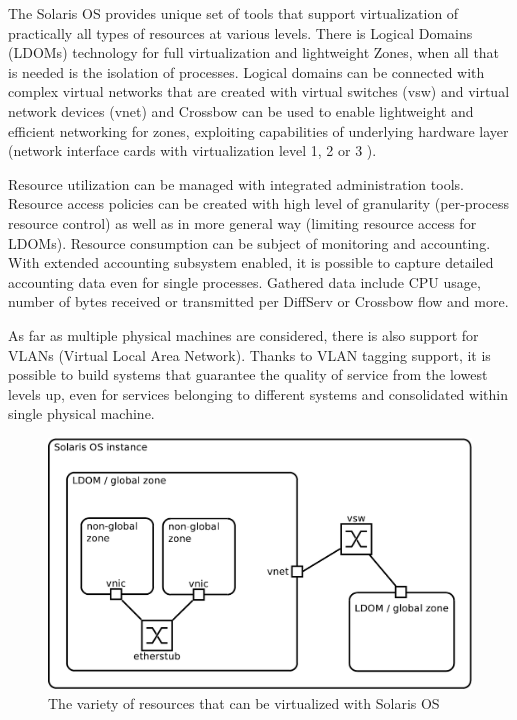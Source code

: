 \documentclass[11pt]{book}
\begin{document}
      The Solaris OS provides unique set of tools that support virtualization of practically all types of resources at
      various levels. There is Logical Domains (LDOMs) technology for full virtualization and lightweight Zones, when
      all that is needed is the isolation of processes. Logical domains can be connected with complex virtual networks
      that are created with virtual switches (vsw) and virtual network devices (vnet) \cite{ldomag} and Crossbow can be
      used to enable lightweight and efficient networking for zones, exploiting capabilities of underlying hardware
      layer (network interface cards with virtualization level 1, 2 or 3 \cite{santos}).

      Resource utilization can be managed with integrated administration tools. Resource access policies can be created
      with high level of granularity (per-process resource control) as well as in more general way (limiting resource
      access for LDOMs). Resource consumption can be subject of monitoring and accounting. With extended accounting
      subsystem enabled, it is possible to capture detailed accounting data even for single processes. Gathered data
      include CPU usage, number of bytes received or transmitted per DiffServ or Crossbow flow and more.

      As far as multiple physical machines are considered, there is also support for VLANs (Virtual Local Area Network).
      Thanks to VLAN tagging support, it is possible to build systems that guarantee the quality of service from the
      lowest levels up, even for services belonging to different systems and consolidated within single physical machine.

      \begin{figure}[H]
        \begin{center}
          \includegraphics[width=.7\textwidth]{img/solaris/full-featured.pdf}
        \end{center}

        \caption{The variety of resources that can be virtualized with Solaris OS}
      \end{figure}
\end{document}
